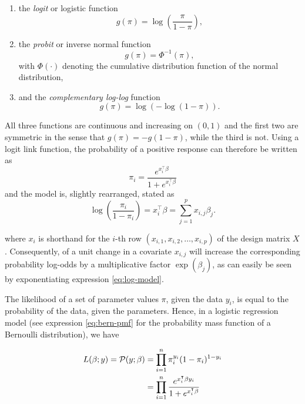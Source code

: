 \begin{enumerate}[label=(\alph*)]
  \item the \textit{logit} or logistic function
  \begin{equation}
    g(\pi) = \log\left(\frac{\pi}{1-\pi}\right),
  \end{equation}
  \item the \textit{probit} or inverse normal function
  \begin{equation}
    g(\pi) = \Phi^{-1}(\pi),
  \end{equation}
  with $\Phi(\cdot)$ denoting the cumulative distribution function of the normal distribution,
  \item and the \textit{complementary log-log} function
  \begin{equation}
    g(\pi) = \log\left(-\log(1-\pi)\right).
  \end{equation}
\end{enumerate}

All three functions are continuous and increasing on $(0,1)$ and the first two are symmetric in the sense that $g(\pi) = -g(1-\pi)$, while the third is not. Using a logit link function, the probability of a positive response can therefore be written as
\begin{equation}
  \pi_i = \frac{e^{x_i^\intercal \beta}}{1+e^{x_i^\intercal \beta}}
\end{equation}
and the model is, slightly rearranged, stated as
\begin{equation}
  \log\left(\frac{\pi_i}{1-\pi_i}\right) = x_i^\intercal \beta = \sum_{j=1}^p x_{i,j}\beta_j.\label{eq:log-model}
\end{equation}

where $x_i$ is shorthand for the $i$-th row $(x_{i,1}, x_{i,2}, \dotsc, x_{i,p})$ of the design matrix $X$. Consequently, of a unit change in a covariate $x_{i,j}$ will increase the corresponding probability log-odds by a multiplicative factor $\exp(\beta_j)$, as can easily be seen by exponentiating expression \ref{eq:log-model}.

The likelihood of a set of parameter values $\pi$, given the data $y_i$, is equal to the probability of the data, given the parameters. Hence, in a logistic regression model (see expression \ref{eq:bern-pmf} for the probability mass function of a Bernoulli distribution), we have

\begin{subequations}
\begin{align}
  L(\beta; y) = \P(y; \beta) &= \prod_{i=1}^n \pi_i^{y_i} (1-\pi_i)^{1-y_i} \label{eq:lik-any} \\
  &= \prod_{i=1}^n \frac{e^{x_i^\intercal \beta y_i}}{1+e^{x_i^\intercal \beta}} \label{eq:lik-logit}
\end{align}
\end{subequations}

